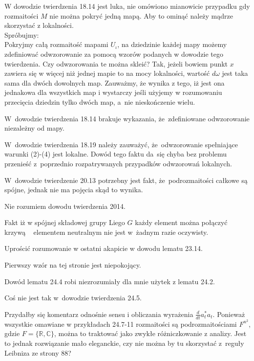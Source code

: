 \documentclass[a4paper,11pt]{article}
\begin{document}
\start {} W dowodzie twierdzenia 18.14 jest luka, nie omówiono mianowicie przypadku gdy rozmaitości $M$ nie można pokryć jedną mapą. Aby to ominąć należy mądrze skorzystać z lokalności. \\Spróbujmy:\\
Pokryjmy całą rozmaitość mapami $U_{ \iota }$, na dziedzinie każdej
mapy możemy zdefiniować odwzorowanie za pomocą wzorów podanych w
dowodzie tego twierdzenia. Czy odwzorowania te można skleić? Tak,
jeżeli bowiem punkt $x$ zawiera się w więcej niż jednej mapie to na
mocy lokalności, wartość $d \omega$ jest taka sama dla dwóch dowolnych
map. Zauważmy, że wynika z tego, iż jest ona jednakowa dla wszystkich
map i wystarczy jeśli użyjemy w rozumowaniu przecięcia dziedzin tylko
dwóch map, a~nie nieskończenie wielu.

\start {} W~dowodzie twierdzenia 18.14 brakuje wykazania,
że~zdefiniowane odwzorowanie niezależny od mapy.

\start {} W~dowodzie twierdzenia 18.19 należy zauważyć,
że~odwzorowanie spełniające warunki (2)-(4) jest lokalne. Dowód tego
faktu da~się chyba bez problemu przenieść z~poprzednio rozpatrywanych
przypadków odwzorowań lokalnych.

\start {} W~dowodzie twierdzenie 20.13 potrzebny jest fakt,
że~podrozmaitości całkowe są spójne, jednak nie ma pojęcia skąd to
wynika.

\start {} Nie rozumiem dowodu twierdzenia 2014.

\start {} Fakt iż w spójnej składowej grupy Liego $ G $ każdy
element można połączyć krzywą ~ elementem neutralnym nie jest w~żadnym
razie oczywisty.

\start {} Uprościć rozumowanie w ostatni akapicie w dowodu
lematu 23.14.

\start {} Pierwszy wzór na tej stronie jest niepokojący.

\start {} Dowód lematu 24.4 robi niezrozumiały dla mnie użytek
z lematu 24.2.

\start {} Coś nie jest tak w~dowodzie twierdzenia 24.5.

\start {} Przydałby się komentarz odnośnie sensu i obliczania
wyrażenia $\frac{ d }{ dt } a^{ * }_{ t } a_{ t }$. Ponieważ wszystkie
omawiane w przykładach 24.7-11 rozmaitości są podrozmaitościami
$F^{ n^{ 2 } }$, gdzie $F = \{ \mathbb{ R }, \mathbb{ C } \}$, można
to traktować jako zwykłe różniczkowanie z analizy. Jest to jednak
rozwiązanie mało eleganckie, czy nie można by tu skorzystać z~reguły
Leibniza ze strony 88?
\end{document}
